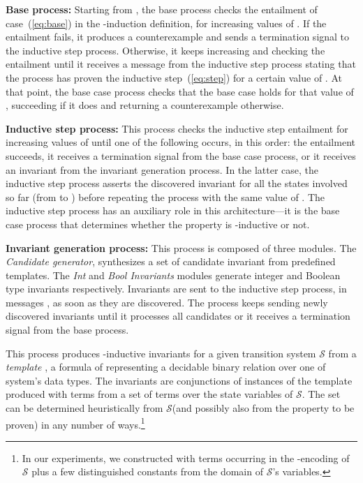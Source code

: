 \documentclass[submission,copyright,creativecommons]{eptcs}
\newcommand{\define}[1]{\emph{#1}}
\newcommand{\sys}{\ensuremath{\mathcal{S}}\xspace}
\begin{document}
\noindent
\textbf{Base process:}
Starting from , the base process checks the
  entailment of case~(\ref{eq:base}) in the -induction definition,
  for increasing values of .  If the entailment fails, it produces
  a counterexample and sends a termination signal  to the
  inductive step process.  Otherwise, it keeps increasing  and
  checking the entailment until it receives a message  from the
  inductive step process stating that the process has
  proven the inductive step~(\ref{eq:step}) for a certain value 
  of .  At that point, the base case process checks that the base
  case holds for that value of , succeeding if it does and
  returning a counterexample otherwise.
\medskip

\noindent
\textbf{Inductive step process:}
This process checks the inductive step entailment for increasing
  values of  until one of the following occurs, in this order:
   the entailment succeeds,  it receives a termination
  signal from the base case process, or  it receives an
  invariant from the invariant generation process.  In the
  latter case, the inductive step process asserts the discovered
  invariant for all the states involved so far (from  to )
  before repeating the process with the same value of . The inductive
  step process has an auxiliary role in this architecture---it is the base case process
  that determines whether the property is -inductive or not.

\medskip

\noindent
\textbf{Invariant generation process:} 
This process is composed of three modules. The \textit{Candidate
  generator}, synthesizes a set of candidate invariant from predefined
templates.  The \textit{Int} and \textit{Bool Invariants} modules
generate integer and Boolean type invariants respectively.
Invariants
are sent to the inductive step process, in messages , as soon as
they are discovered. The process keeps sending newly discovered
invariants until it processes all candidates or it receives a
termination signal  from the base process.

This process produces -inductive invariants for a given transition
system \sys from a \define{template} , a formula of
 representing a decidable binary relation over one of system's
data types.  The invariants are conjunctions of instances  of
the template produced with terms  from a set  of terms over
the state variables of \sys.  The set  can be determined
heuristically from \sys (and possibly also from the property  to be
proven) in any number of ways.\footnote{ In our experiments, we
  constructed 
  with terms occurring in the -encoding of \sys plus
  a few distinguished constants from the domain of \sys's
  variables.  }
\end{document}
